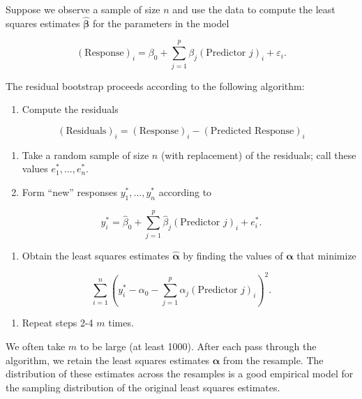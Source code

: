 \documentclass[
  letterpaper,
  DIV=11,
  numbers=noendperiod]{scrreprt}
\providecommand{\tightlist}{%
  \setlength{\itemsep}{0pt}\setlength{\parskip}{0pt}}\usepackage{longtable,booktabs,array}
\theoremstyle{definition}
\theoremstyle{definition}
\theoremstyle{remark}
\begin{document}
\begin{description}
\tightlist
\item[Residual Bootstrap (Definition~\ref{def-residual-bootstrap})]
Suppose we observe a sample of size \(n\) and use the data to compute
the least squares estimates \(\widehat{\boldsymbol{\beta}}\) for the
parameters in the model
\end{description}

\[(\text{Response})_i = \beta_0 + \sum_{j=1}^{p} \beta_j (\text{Predictor } j)_i + \varepsilon_i.\]

The residual bootstrap proceeds according to the following algorithm:

\begin{enumerate}
\def\labelenumi{\arabic{enumi}.}
\tightlist
\item
  Compute the residuals
\end{enumerate}

\[(\text{Residuals})_i = (\text{Response})_i - (\text{Predicted Response})_i\]

\begin{enumerate}
\def\labelenumi{\arabic{enumi}.}
\setcounter{enumi}{1}
\tightlist
\item
  Take a random sample of size \(n\) (with replacement) of the
  residuals; call these values \(e_1^*, \dotsc, e_n^*\).
\item
  Form ``new'' responses \(y_1^*, \dotsc, y_n^*\) according to
\end{enumerate}

\[y_i^* = \widehat{\beta}_0 + \sum_{j=1}^{p} \widehat{\beta}_j (\text{Predictor } j)_i + e_i^*.\]

\begin{enumerate}
\def\labelenumi{\arabic{enumi}.}
\setcounter{enumi}{3}
\tightlist
\item
  Obtain the least squares estimates \(\widehat{\boldsymbol{\alpha}}\)
  by finding the values of \(\boldsymbol{\alpha}\) that minimize
\end{enumerate}

\[\sum_{i=1}^{n} \left(y_i^* - \alpha_0 - \sum_{j=1}^{p} \alpha_j (\text{Predictor } j)_i\right)^2.\]

\begin{enumerate}
\def\labelenumi{\arabic{enumi}.}
\setcounter{enumi}{4}
\tightlist
\item
  Repeat steps 2-4 \(m\) times.
\end{enumerate}

We often take \(m\) to be large (at least 1000). After each pass through
the algorithm, we retain the least squares estimates
\(\widehat{\boldsymbol{\alpha}}\) from the resample. The distribution of
these estimates across the resamples is a good empirical model for the
sampling distribution of the original least squares estimates.
\end{document}
